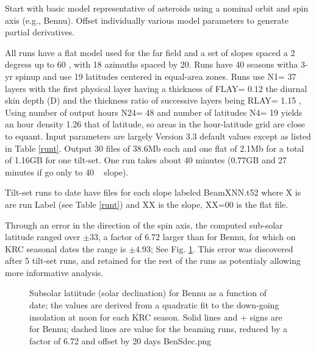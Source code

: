 \documentclass{article}
\begin{document}
 Start with basic model representative of asteroids using a nominal orbit and
 spin axis (e.g., Bennu). Offset individually various model parameters to
 generate partial derivatives.

 All runs have a flat model used for the far field and a set of slopes spaced a
 2 degress up to 60 \qd, with 18 azimuths spaced by 20\qd. Runs have 40 seasons
 witha 3-yr spinup and use 19 latitudes centered in equal-area zones. Runs use
 N1= 37 layers with the first physical layer having a thickness of FLAY= 0.12
 the diurnal skin depth (D) and the thickness ratio of successive layers being
 RLAY= 1.15 , Using number of output hours N24= 48 and number of latitudes N4=
 19 yields an hour density 1.26 that of latitude, so areas in the hour-latitude
 grid are close to equant.  Input parameters are largely Version 3.3 default
 values except as listed in Table \ref{runt}. Output 30 files of 38.6Mb each and
 one flat of 2.1Mb for a total of 1.16GB for one tilt-set. One run takes about
 40 minutes (0.77GB and 27 minutes if go only to 40 \qd~ slope).

Tilt-set runs to date have files for each slope labeled BeamXNN.t52 where X is
are run Label (see Table \ref{runt}) and XX is the slope, XX=00 is the flat
file.

Through an error in the direction of the spin axis, the computed sub-solar
latitude ranged over $\pm 33$\qd, a factor of 6.72 larger than for Bennu, for
which on KRC seasonal dates the range is $\pm 4.93$\qd; See
Fig. \ref{BenSdec}. This error was discovered after 5 tilt-set runs, and
retained for the rest of the runs as potentialy allowing more informative
analysis.
\begin{figure}[!ht] 
\caption[Sub-solar latitude]{Subsolar latiitude (solar declination) for Bennu as
  a function of date; the values are derived from a quadratic fit to the
  down-going insolation at noon for each KRC season.  Solid lines and + signs
  are for Bennu; dashed lines are value for the beaming runs, reduced by a
  factor of 6.72 and offset by 20 days
\label{BenSdec}  BenSdec.png  }
\end{figure} 


\appendix %
\end{document}
